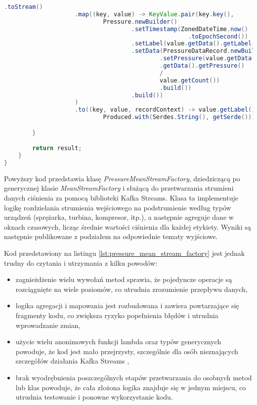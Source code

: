 \begin{lstlisting}[caption=Poprzednia implementacja przetwarzająca strumienie danych, label={lst:pressure_mean_stream_factory},language=Java]
                    .toStream()
                    .map((key, value) -> KeyValue.pair(key.key(),
                            Pressure.newBuilder()
                                    .setTimestamp(ZonedDateTime.now()
                                                    .toEpochSecond())
                                    .setLabel(value.getData().getLabel())
                                    .setData(PressureDataRecord.newBuilder()
                                            .setPressure(value.getData()
                                            .getData().getPressure() 
                                            / 
                                            value.getCount())
                                            .build())
                                    .build())
                    )
                    .to((key, value, recordContext) -> value.getLabel().toString() + getOutputTopicsPostfix(),
                            Produced.with(Serdes.String(), getSerde()));

        }

        return result;
    }
}  

\end{lstlisting}

Powyższy kod przedstawia klasę \textit{PressureMeanStreamFactory}, dziedziczącą po generycznej klasie \textit{\mbox{MeanStreamFactory}} i służącą do przetwarzania strumieni danych ciśnienia za pomocą biblioteki Kafka Streams. Klasa ta implementuje logikę rozdzielania strumienia wejściowego na podstrumienie według typów urządzeń (sprężarka, turbina, kompresor, itp.), a następnie agreguje dane w oknach czasowych, licząc średnie wartości ciśnienia dla każdej etykiety. Wyniki są następnie publikowane z podziałem na odpowiednie tematy wyjściowe.

\vspace{0.3em}

Kod przedstawiony na listingu \ref{lst:pressure_mean_stream_factory} jest jednak trudny do czytania i utrzymania z kilku powodów:
\begin{itemize}
    \item zagnieżdżenie wielu wywołań metod sprawia, że pojedyncze operacje są rozciągnięte na wiele poziomów, co utrudnia zrozumienie przepływu danych,
    \item logika agregacji i mapowania jest rozbudowana i zawiera powtarzające się fragmenty kodu, co zwiększa ryzyko popełnienia błędów i utrudnia wprowadzanie zmian,
    \item użycie wielu anonimowych funkcji lambda oraz typów generycznych powoduje, że kod jest mało przejrzysty, szczególnie dla osób nieznających szczegółów działania Kafka Streams \cite{kafka_streams},
    \item brak wyodrębnienia poszczególnych etapów przetwarzania do osobnych metod lub klas powoduje, że cała złożona logika znajduje się w jednym miejscu, co utrudnia testowanie i ponowne wykorzystanie kodu.
\end{itemize}


